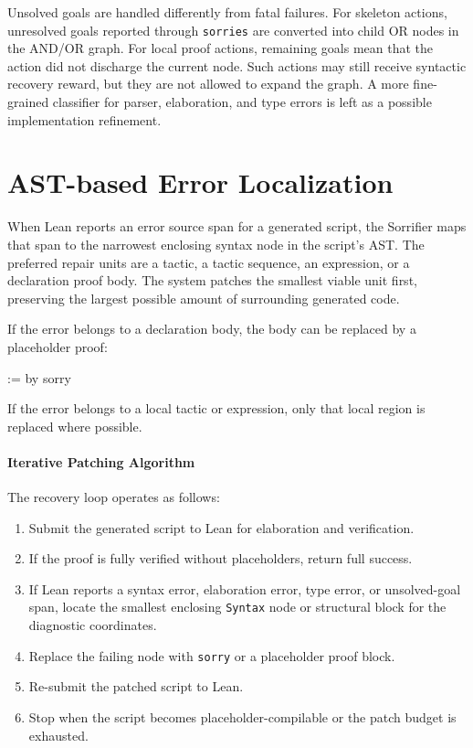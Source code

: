 Unsolved goals are handled differently from fatal failures. For skeleton actions, unresolved goals reported
through \texttt{sorries} are converted into child OR nodes in the AND/OR graph. For local proof
actions, remaining goals mean that the action did not discharge the current node. Such actions may still
receive syntactic recovery reward, but they are not allowed to expand the graph. A more fine-grained
classifier for parser, elaboration, and type errors is left as a possible implementation refinement.

\section{AST-based Error Localization}

When Lean reports an error source span for a generated script, the Sorrifier maps that span to the narrowest enclosing syntax node in the script's AST. The preferred repair units are a tactic, a tactic sequence, an expression, or a declaration proof body. The system patches the smallest viable unit first, preserving the largest possible amount of surrounding generated code.

If the error belongs to a declaration body, the body can be replaced by a placeholder proof:
\begin{leanblock}
:= by
  sorry
\end{leanblock}
If the error belongs to a local tactic or expression, only that local region is replaced where possible.

\paragraph{Iterative Patching Algorithm}

The recovery loop operates as follows:
\begin{enumerate}
    \item Submit the generated script to Lean for elaboration and verification.
    \item If the proof is fully verified without placeholders, return full success.
    \item If Lean reports a syntax error, elaboration error, type error, or unsolved-goal span, locate the smallest enclosing \texttt{Syntax} node or structural block for the diagnostic coordinates.
    \item Replace the failing node with \texttt{sorry} or a placeholder proof block.
    \item Re-submit the patched script to Lean.
    \item Stop when the script becomes placeholder-compilable or the patch budget is exhausted.
\end{enumerate}

